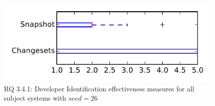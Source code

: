 
\begin{figure}
\centering
\includegraphics[height=0.4\textheight]{figures/dit_seed/rq1_tiny_26}
\caption{RQ 3.4.1: Developer Identification effectiveness measures for all subject systems with $seed=26$}
\label{fig:dit_seed:rq1:tiny}
\end{figure}
